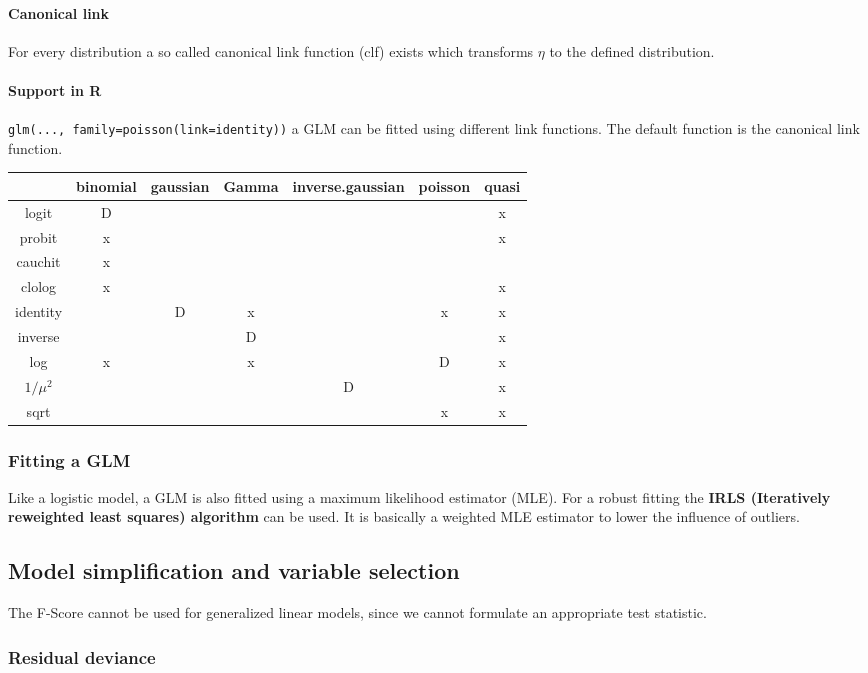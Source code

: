 \paragraph{Canonical link}
For every distribution a so called canonical link function (clf) exists which transforms $\eta$ to the defined distribution.

\paragraph{Support in R}
\lstinline{glm(..., family=poisson(link=identity))} a GLM can be fitted using different link functions. The default function is the canonical link function.

\begin{tabular}{c|cccccc}
	& binomial & gaussian & Gamma & inverse.gaussian & poisson & quasi \\
	\hline 
	logit & D & & & & & x \\
	probit & x & & & & & x \\
	cauchit & x & & & & &  \\
	clolog & x & & & & & x \\
	identity & & D & x & & x & x \\
	inverse & & & D & & & x \\
	log & x & & x & & D & x \\
	$1/\mu^2$ & & & & D & & x \\
	sqrt & & & & & x & x \\
\end{tabular}

\subsubsection{Fitting a GLM}

Like a logistic model, a GLM is also fitted using a maximum likelihood estimator (MLE). For a robust fitting the \textbf{IRLS (Iteratively reweighted least squares) algorithm} can be used. It is basically a weighted MLE estimator to lower the influence of outliers.

\subsection{Model simplification and variable selection}

The F-Score cannot be used for generalized linear models, since we cannot formulate an appropriate test statistic.

\subsubsection{Residual deviance}


